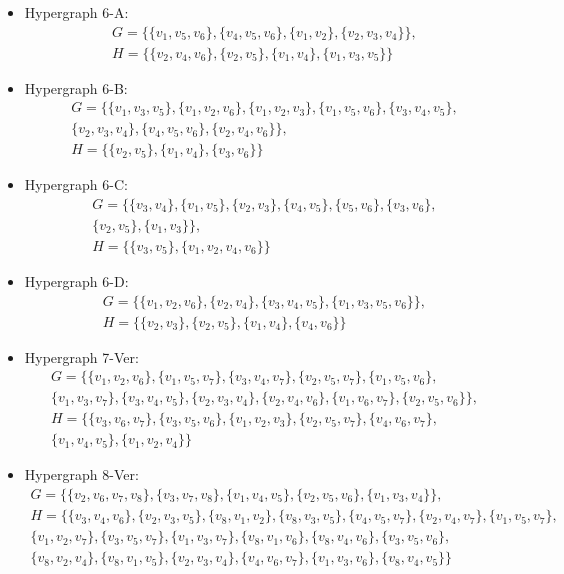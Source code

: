 \begin{itemize}
\item Hypergraph 6-A:
\begin{gather*}
G=\{\{v_1,v_5,v_6\},\{v_4,v_5,v_6\},\{v_1,v_2\},\{v_2,v_3,v_4\}\},\\[4pt]
H=\{\{v_2,v_4,v_6\},\{v_2,v_5\},\{v_1,v_4\},\{v_1,v_3,v_5\}\}
\end{gather*}
\item Hypergraph 6-B:
\begin{gather*}
G=\{\{v_1,v_3,v_5\},\{v_1,v_2,v_6\},\{v_1,v_2,v_3\},\{v_1,v_5,v_6\},\{v_3,v_4,v_5\},\\[4pt]
\{v_2,v_3,v_4\},\{v_4,v_5,v_6\},\{v_2,v_4,v_6\}\},\\[4pt]
H=\{\{v_2,v_5\},\{v_1,v_4\},\{v_3,v_6\}\}
\end{gather*}
\item Hypergraph 6-C:
\begin{gather*}
G=\{\{v_3,v_4\},\{v_1,v_5\},\{v_2,v_3\},\{v_4,v_5\},\{v_5,v_6\},\{v_3,v_6\},\\[4pt]
\{v_2,v_5\},\{v_1,v_3\}\},\\[4pt]
H=\{\{v_3,v_5\},\{v_1,v_2,v_4,v_6\}\}
\end{gather*}
\item Hypergraph 6-D:
\begin{gather*}
G=\{\{v_1,v_2,v_6\},\{v_2,v_4\},\{v_3,v_4,v_5\},\{v_1,v_3,v_5,v_6\}\},\\[4pt]
H=\{\{v_2,v_3\},\{v_2,v_5\},\{v_1,v_4\},\{v_4,v_6\}\}
\end{gather*}
\item Hypergraph 7-Ver:
\begin{gather*}
G=\{\{v_1,v_2,v_6\},\{v_1,v_5,v_7\},\{v_3,v_4,v_7\},\{v_2,v_5,v_7\},\{v_1,v_5,v_6\},\\[4pt]
\{v_1,v_3,v_7\},\{v_3,v_4,v_5\},\{v_2,v_3,v_4\},\{v_2,v_4,v_6\},\{v_1,v_6,v_7\},\{v_2,v_5,v_6\}\},\\[4pt]
H=\{\{v_3,v_6,v_7\},\{v_3,v_5,v_6\},\{v_1,v_2,v_3\},\{v_2,v_5,v_7\},\{v_4,v_6,v_7\},\\[4pt]
\{v_1,v_4,v_5\},\{v_1,v_2,v_4\}\}
\end{gather*}
\item Hypergraph 8-Ver:
\begin{gather*}
G=\{\{v_2,v_6,v_7,v_8\},\{v_3,v_7,v_8\},\{v_1,v_4,v_5\},\{v_2,v_5,v_6\},\{v_1,v_3,v_4\}\},\\[4pt]
H=\{\{v_3,v_4,v_6\},\{v_2,v_3,v_5\},\{v_8,v_1,v_2\},\{v_8,v_3,v_5\},\{v_4,v_5,v_7\},\{v_2,v_4,v_7\},\{v_1,v_5,v_7\},\\[4pt]
\{v_1,v_2,v_7\},\{v_3,v_5,v_7\},\{v_1,v_3,v_7\},\{v_8,v_1,v_6\},\{v_8,v_4,v_6\},\{v_3,v_5,v_6\},\\[4pt]
\{v_8,v_2,v_4\},\{v_8,v_1,v_5\},\{v_2,v_3,v_4\},\{v_4,v_6,v_7\},\{v_1,v_3,v_6\},\{v_8,v_4,v_5\}\}
\end{gather*}
\end{itemize}

